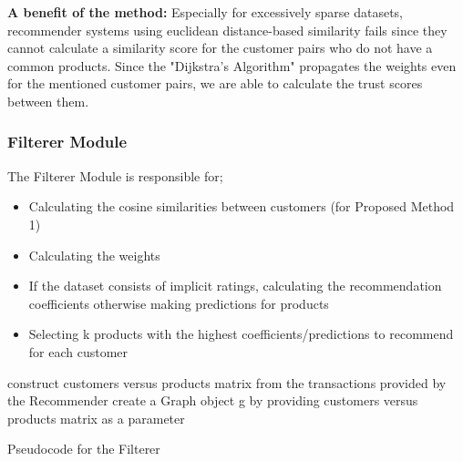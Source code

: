 	\textbf{A benefit of the method:} Especially for excessively sparse datasets, recommender systems using euclidean distance-based similarity fails since they cannot calculate a similarity score for the customer pairs who do not have a common products.	Since the  "Dijkstra's Algorithm" propagates the weights even for the mentioned customer pairs, we are able to calculate the trust scores between them.
	
	\subsubsection{Filterer Module} The Filterer Module is responsible for;
	\begin{itemize}
	\item Calculating the cosine similarities between customers (for Proposed Method 1)
	\item Calculating the weights
	\item If the dataset consists of implicit ratings, calculating the recommendation coefficients otherwise making predictions for products
	\item Selecting k products with the highest coefficients/predictions to recommend for each customer
	\end{itemize}

	{
	\center
	\begin{algorithm}[H]
		\NoCaptionOfAlgo
		\SetAlgoLined
			construct customers versus products matrix from the transactions provided by the Recommender\;
			create a Graph object g by providing customers versus products matrix as a parameter\;
		\caption{Pseudocode for the Filterer}
	\end{algorithm}
}

